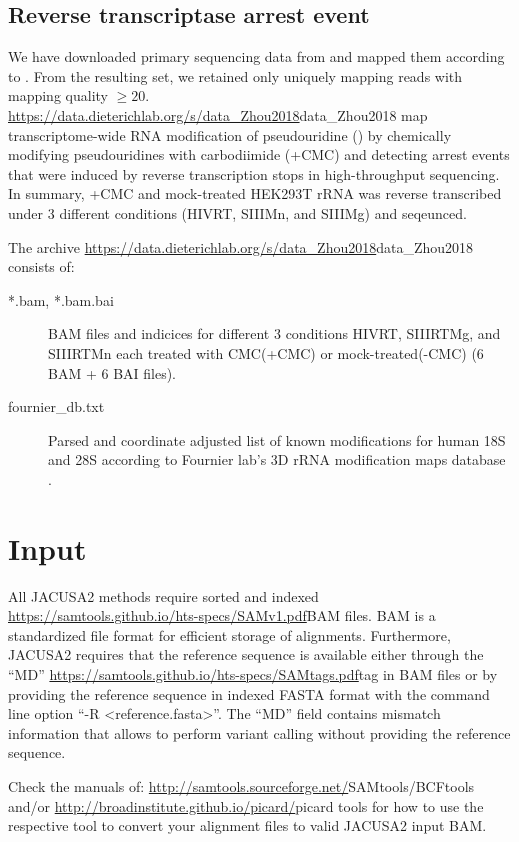 \documentclass[10pt,a4paper]{article}
\begin{document}
\subsection{Reverse transcriptase arrest event}
We have downloaded primary sequencing data from \cite{Zhou2018} and mapped them according to .
From the resulting set, we retained only uniquely mapping reads with mapping quality $\ge 20$.
\url{https://data.dieterichlab.org/s/data_Zhou2018}{data\_Zhou2018} 
\cite{Zhou2018} map transcriptome-wide RNA modification of pseudouridine (\PSI) by chemically modifying 
pseudouridines with carbodiimide (+CMC) and detecting arrest events that were induced by reverse transcription 
stops in high-throughput sequencing. In summary, +CMC and mock-treated HEK293T rRNA was reverse 
transcribed under 3 different conditions (HIVRT, SIIIMn, and SIIIMg) and seqeunced.

The archive \url{https://data.dieterichlab.org/s/data_Zhou2018}{data\_Zhou2018} consists of:
\begin{description}
  \item[*.bam, *.bam.bai] BAM files and indicices for different 3 conditions HIVRT, SIIIRTMg, and SIIIRTMn each treated 
  with CMC(+CMC) or mock-treated(-CMC) (6 BAM + 6 BAI files).
  \item[fournier\_db.txt] Parsed and coordinate adjusted list of known modifications for human 18S and 28S 
  according to Fournier lab's 3D rRNA modification maps database \cite{PieknaPrzybylska2007}. 
\end{description}
\section{Input}
All JACUSA2 methods require sorted and indexed \url{https://samtools.github.io/hts-specs/SAMv1.pdf}{BAM} files.
BAM is a standardized file format for efficient storage of alignments.
Furthermore, JACUSA2 requires that the reference sequence is available either through the ``MD'' 
\url{https://samtools.github.io/hts-specs/SAMtags.pdf}{tag} in BAM files or by providing the reference 
sequence in indexed FASTA format with the command line option ``-R <reference.fasta>''.
The ``MD'' field contains mismatch information that allows to perform variant calling without providing 
the reference sequence.

Check the manuals of: \url{http://samtools.sourceforge.net/}{SAMtools/BCFtools} and/or
\url{http://broadinstitute.github.io/picard/}{picard tools} for how to use the
respective tool to convert your alignment files to valid JACUSA2 input BAM.
\end{document}
